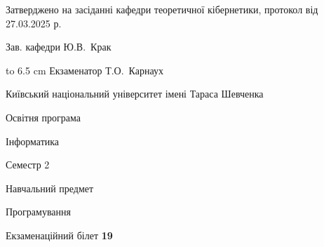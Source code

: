 \documentclass[12pt, ukrainian]{article}
\begin{document}
{\smallskip\smallskip \begin {scriptsize} Затверджено на засіданні кафедри теоретичної кібернетики, протокол   від   27.03.2025 р.\par\smallskip\smallskip\smallskip\smallskip
{\parbox {6.5 cm} {Зав. кафедри \dotfill Ю.В.~Крак}}\hspace {0.7cm} {\hbox to 6.5 cm { Екзаменатор \dotfill Т.О.~Карнаух}} \end{scriptsize}}
\newpage
{{\begin {scriptsize}\par
{ \center  Київський національний університет імені Тараса Шевченка \par}
{\parbox {5 cm}{Освітня програма \hfill}{\parbox {7 cm}{Інформатика\hfill}}\parbox {6 cm}{\hfill Семестр 2}}\par
{\parbox {5 cm} {Навчальний предмет \hfill}\parbox {7 cm}{Програмування \hfill}\parbox {6cm}{\hfill}\par}\vspace{-15pt} \end{scriptsize}}{\center Екзаменаційний білет \No \textbf { 19 }\par}}
\end{document}
